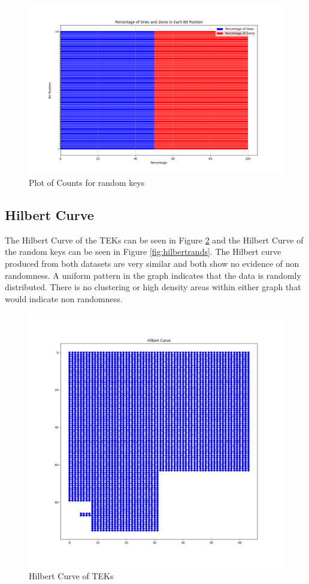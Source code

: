 \begin{figure}[H]
\centering
\includegraphics[width=1\textwidth]{final0s1sboth.png}
\caption{Plot of Counts for random keys}
\label{fig:countsrands}
\end{figure}

\subsection{Hilbert Curve}

The Hilbert Curve of the TEKs can be seen in Figure \ref{fig:hilbertteks} and the Hilbert Curve of the random keys can be seen in Figure \ref{fig:hilbertrands}. The Hilbert curve produced from both datasets are very similar and both show no evidence of non randomness. A uniform pattern in the graph indicates that the data is randomly distributed. There is no clustering or high density areas within either graph that would indicate non randomness. 

\begin{figure}[H]
\centering
\includegraphics[width=1\textwidth]{hilbertCurveteks.png}
\caption{Hilbert Curve of TEKs}
\label{fig:hilbertteks}
\end{figure}

